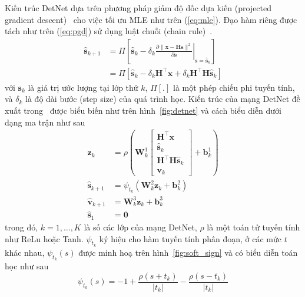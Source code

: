 Kiến trúc DetNet dựa trên phương pháp giảm độ dốc dựa kiến (projected gradient descent)~\cite{Chen2015} cho việc tối ưu MLE như trên (\ref{eq:mle}). Đạo hàm riêng được tách như trên (\ref{eq:pgd}) sử dụng luật chuỗi (chain rule)~\cite{Minka2000}.
\begin{equation}
\label{eq:pgd}
    \begin{aligned}
    \hat{\mathbf{s}}_{k+1} & =\Pi\left[\hat{\mathbf{s}}_k-\left.\delta_k \frac{\partial\|\mathbf{x}-\mathbf{H} \mathbf{s}\|^2}{\partial \mathbf{s}}\right|_{\mathbf{s}=\hat{\mathbf{s}}_k}\right] \\
    & =\Pi\left[\hat{\mathbf{s}}_k-\delta_k \mathbf{H}^\top \mathbf{x}+\delta_k \mathbf{H}^\top \mathbf{H} \hat{\mathbf{s}}_k\right]
    \end{aligned}
\end{equation}
với $\mathbf{s}_k$ là giá trị ước lượng tại lớp thứ $k$, $\Pi [.]$ là một phép chiếu phi tuyến tính, và $\delta_k$ là độ dài bước (step size) của quá trình học. Kiến trúc của mạng DetNet đề xuất trong~\cite{Samuel2017} được biểu biến như trên hình~\ref{fig:detnet} và cách biểu diễn dưới dạng ma trận như sau
\allowdisplaybreaks
\begin{subequations}
\begin{alignat}{4}
    \mathbf{z}_k & =\rho\left(\mathbf{W}^1_{k}\left[\begin{array}{c}
    \mathbf{H}^\top \mathbf{x} \\
    \hat{\mathbf{s}}_k \\
    \mathbf{H}^\top \mathbf{H} \hat{\mathbf{s}}_k \\
    \mathbf{v}_k
    \end{array}\right]+\mathbf{b}^1_{k}\right) \\
    \hat{\mathbf{s}}_{k+1} & =\psi_{t_k}\left(\mathbf{W}^2_{k} \mathbf{z}_k+ \mathbf{b}^2_{k}\right) \\
    \hat{\mathbf{v}}_{k+1} & =\mathbf{W}^3_{k} \mathbf{z}_k+ 
    \mathbf{b}^3_{k} \\
    \hat{\mathbf{s}}_1 & =\mathbf{0}
\end{alignat}
\end{subequations}
trong đó, $k = 1, \ldots, K$ là số các lớp của mạng DetNet, $\rho$ là một toán tử tuyến tính như ReLu hoặc Tanh. $\psi_{t_k}$ ký hiệu cho hàm tuyến tính phân đoạn, ở các mức $t$ khác nhau, $\psi_{t_k}(s)$ được minh hoạ trên hình~\ref{fig:soft_sign} và có biểu diễn toán học như sau
\begin{equation}
    \psi_{t_k}(s)=-1+\frac{\rho\left(s + t_k \right)}{\left|t_k\right|}-\frac{\rho\left(s- t_k \right)}{\left|t_k\right|}
\end{equation}

